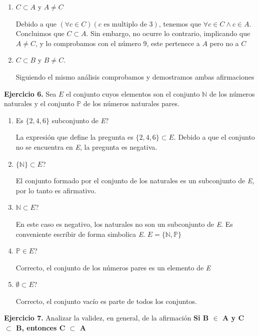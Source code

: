 \begin{enumerate}
	\item $C \subset A$ y $A \neq C$
	
	Debido a que $(\forall c \in C)(c \text{ es multiplo de 3})$, tenemos que $\forall c \in C \wedge c \in A$. Concluimos que $C \subset A$. Sin embargo, no ocurre lo contrario, implicando que $A \neq C$, y lo comprobamos con el n\'umero 9, este pertenece a $A$ pero no a $C$
	
	\item $C \subset B$ y $B \neq C$.
	
	Siguiendo el mismo an\'alisis comprobamos y demostramos ambas afirmaciones
\end{enumerate}

\textbf{Ejercicio 6.} Sea $E$ el conjunto cuyos elementos son el conjunto $\mathbb{N}$ de los n\'umeros naturales y el conjunto $\mathbb{P}$ de los n\'umeros naturales pares.

\begin{enumerate}
	\item \textquestiondown Es $\{2, 4, 6\}$ subconjunto de \textit{E}?
	
	La expresi\'on que define la pregunta es $\{2, 4, 6\} \subset E$. Debido a que el conjunto no se encuentra en \textit{E}, la pregunta es negativa.
	
	\item \textquestiondown $\{\mathbb{N}\} \subset E$?
	
	El conjunto formado por el conjunto de los naturales es un subconjunto de \textit{E}, por lo tanto es afirmativo.
	
	\item \textquestiondown $\mathbb{N} \subset E$?
	
	En este caso es negativo, los naturales no son un subconjunto de \textit{E}. Es conveniente escribir de forma simbolica \textit{E}. $E = \{\mathbb{N}, \mathbb{P}\}$
	
	\item \textquestiondown $\mathbb{P} \in E$?
	
	Correcto, el conjunto de los n\'umeros pares es un elemento de \textit{E}
	
	\item \textquestiondown $\emptyset \subset E$? 
	
	Correcto, el conjunto vac\'io es parte de todos los conjuntos.
\end{enumerate}

\textbf{Ejercicio 7.} Analizar la validez, en general, de la afirmación \textbf{Si B $\in$ A y C $\subset$ B, entonces C $\subset$ A}

